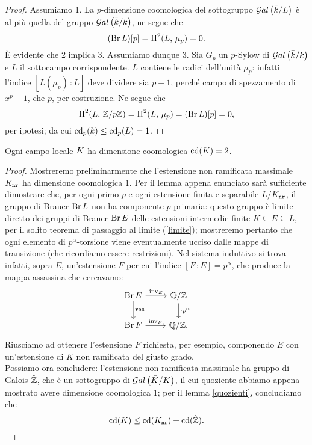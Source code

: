 \begin{proof}
	Assumiamo 1. La $ p $-dimensione coomologica del sottogruppo $ \mathcal{G}al\left( \bar{k}/L \right) $ è al più quella del gruppo $ \mathcal{G}al\left( \bar{k}/k \right) $, ne segue che
	\[ (\operatorname{Br} L) [p] = \operatorname{H}^2(L, \, \mu_p) = 0. \]
	È evidente che 2 implica 3. Assumiamo dunque 3. Sia $ G_p $ un $ p $-Sylow di $ \mathcal{G}al\left( \bar{k}/k \right) $ e $ L $ il sottocampo corrispondente. $ L $ contiene le radici dell'unità $ \mu_p $: infatti l'indice $ [L(\mu_p)\,\colon L] $ deve dividere sia $ p-1 $, perché campo di spezzamento di $ x^p-1 $, che $ p $, per costruzione. Ne segue che
	\[ \operatorname{H}^2(L, \, \mathbb{Z}/p\mathbb{Z}) = \operatorname{H}^2(L, \, \mu_p) = (\operatorname{Br} L)[p] = 0, \]
	per ipotesi; da cui $ \operatorname{cd}_p(k) \leq \operatorname{cd}_p(L) = 1 $.
\end{proof}

\begin{theorem}
	Ogni campo locale $ K $ ha dimensione coomologica $ \operatorname{cd}(K) = 2 $.
\end{theorem}
\begin{proof}
	Mostreremo preliminarmente che l'estensione non ramificata massimale $ K_\mathtt{nr} $ ha dimensione coomologica $ 1 $. Per il lemma appena enunciato sarà sufficiente dimostrare che, per ogni primo $ p $ e ogni estensione finita e separabile $ L/K_\mathtt{nr} $, il gruppo di Brauer $ \operatorname{Br} L $ non ha componente $ p $-primaria: questo gruppo è limite diretto dei gruppi di Brauer $ \operatorname{Br} E $ delle estensioni intermedie finite $ K \subseteq E \subseteq L $, per il solito teorema di passaggio al limite (\ref{limite}); mostreremo pertanto che ogni elemento di $ p^\alpha $-torsione viene eventualmente ucciso dalle mappe di transizione (che ricordiamo essere restrizioni). Nel sistema induttivo si trova infatti, sopra $ E $, un'estensione $ F $ per cui l'indice $ [F \,\colon E] = p^\alpha $, che produce la mappa assassina che cercavamo:
	\[ \begin{tikzcd}
	\Br E \rar["\inv_E"] \dar["\Res"]
	& \Q/\Z \dar["\cdot p^\alpha"] \\
	\Br F \rar["\inv_F"]
	& \Q/\Z.
	\end{tikzcd} \]
	Riusciamo ad ottenere l'estensione $ F $ richiesta, per esempio, componendo $ E $ con un'estensione di $ K $ non ramificata del giusto grado.\\
	
	Possiamo ora concludere: l'estensione non ramificata massimale ha gruppo di Galois $ \hat{\mathbb{Z}} $, che è un sottogruppo di $ \mathcal{G}al\left( \bar{K}/K \right) $, il cui quoziente abbiamo appena mostrato avere dimensione coomologica 1; per il lemma \ref{quozienti}, concludiamo che 
	$$  \operatorname{cd}(K) \leq \operatorname{cd}(K_\mathtt{nr}) + \operatorname{cd}(\hat{\mathbb{Z}}).  $$
\end{proof}